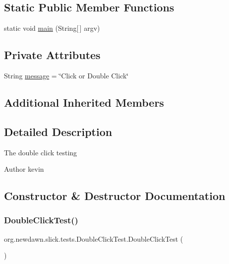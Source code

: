\subsection*{Static Public Member Functions}
\begin{DoxyCompactItemize}
\item 
static void \mbox{\hyperlink{classorg_1_1newdawn_1_1slick_1_1tests_1_1_double_click_test_a5f6032221b0341b620824798669ae7ea}{main}} (String\mbox{[}$\,$\mbox{]} argv)
\end{DoxyCompactItemize}
\subsection*{Private Attributes}
\begin{DoxyCompactItemize}
\item 
String \mbox{\hyperlink{classorg_1_1newdawn_1_1slick_1_1tests_1_1_double_click_test_ab7f5f424e09fe1617e6d75e1cafb057e}{message}} = \char`\"{}Click or Double Click\char`\"{}
\end{DoxyCompactItemize}
\subsection*{Additional Inherited Members}


\subsection{Detailed Description}
The double click testing

\begin{DoxyAuthor}{Author}
kevin 
\end{DoxyAuthor}


\subsection{Constructor \& Destructor Documentation}
\mbox{\label{classorg_1_1newdawn_1_1slick_1_1tests_1_1_double_click_test_ad24f50877789bacdf4cae61677529ca5}} 
\subsubsection{\texorpdfstring{Double\+Click\+Test()}{DoubleClickTest()}}
{\footnotesize\ttfamily org.\+newdawn.\+slick.\+tests.\+Double\+Click\+Test.\+Double\+Click\+Test (\begin{DoxyParamCaption}{ }\end{DoxyParamCaption})\hspace{0.3cm}{\ttfamily [inline]}}

